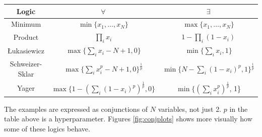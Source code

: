 \begin{center}
\begin{tabular}{ c | c c }
    Logic & $\forall$ & $\exists$ \\    
    \hline
    Minimum 
    & $\min\{ x_1, \dots, x_N \}$ 
    & $\max\{ x_1, \dots, x_N \}$ \\ 
    Product 
    & $\prod_ix_i$
    & $1 - \prod_{i}(1-x_i)$ \\
    Łukasiewicz
    & $\max\{\sum_ix_i - N + 1, 0\}$ 
    & $\min\{\sum_ix_i, 1\}$ \\
    Schweizer-Sklar
    & $\max\{\sum_ix^p_i - N + 1, 0\}^\frac{1}{p}$ 
    & $\min\{N-\sum_i(1-x_i)^p, 1\}^\frac{1}{p}$ \\
    Yager
    & $\max\{1 - (\sum_i(1-x_i)^p)^\frac{1}{p}, 0\}$ 
    & $\min\{(\sum_ix^p_i)^\frac{1}{p}$, 1\} \\
\end{tabular}
\end{center}

The examples are expressed as conjunctions of $N$ variables, not just 2. $p$ in the table above is a hyperparameter. Figures \ref{fig:conjplots} shows more visually how some of these logics behave.

